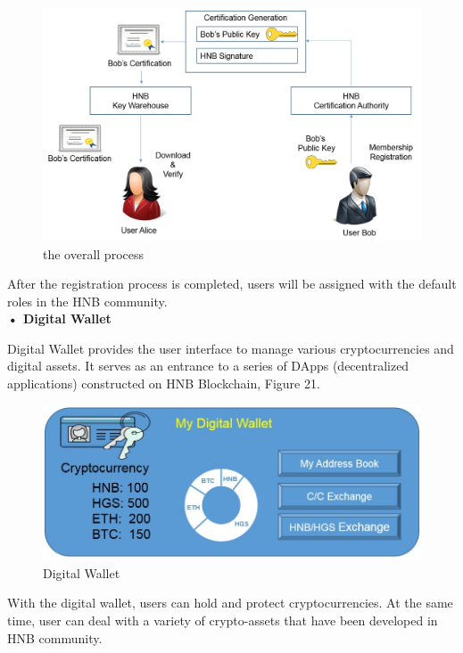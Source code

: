 \documentclass[fleqn,10pt]{SelfArx} %
\begin{document}
\begin{figure}[!hpbt]\centering %
\includegraphics[width=\linewidth]{21}
\caption{the overall process}
\label{fig:21}
\end{figure}

After the registration process is completed, users will be assigned with the default roles in the HNB community. \\

\textbf {•	Digital Wallet}

Digital Wallet provides the user interface to manage various cryptocurrencies and digital assets. It serves as an entrance to a series of DApps (decentralized applications) constructed on HNB Blockchain, Figure 21. \\


\begin{figure}[ht]\centering
\includegraphics[width=\linewidth]{22}
\caption{Digital Wallet}
\label{fig:22}
\end{figure}

With the digital wallet, users can hold and protect cryptocurrencies. At the same time, user can deal with a variety of crypto-assets that have been developed in HNB community. \\
\end{document}
